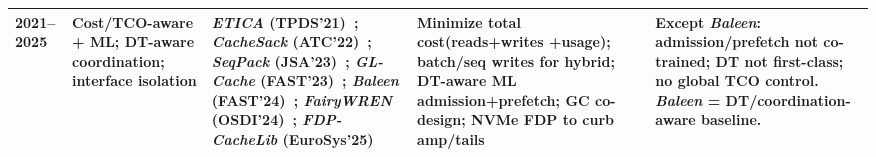 \begin{table}[ht]
\begin{center}
\begin{tabularx}{\columnwidth}{
|>{\centering\arraybackslash}p{0.6cm}
|>{\centering\arraybackslash}p{1.5cm}
|>{\centering\arraybackslash}p{2.35cm}
|>{\centering\arraybackslash}p{2.0cm}
|>{\centering\arraybackslash}p{1.6cm}|}
\textbf{2021--2025} &
Cost/TCO-aware + ML; DT-aware coordination; interface isolation &
\textit{ETICA} (TPDS'21)~\cite{ahmadian2021etica}; 
\textit{CacheSack} (ATC'22)~\cite{yang2022cachesack}; 
\textit{SeqPack} (JSA'23)~\cite{tang2023seqpack}; 
\textit{GL-Cache} (FAST'23)~\cite{yang2023glcache}; 
\textit{Baleen} (FAST'24)~\cite{wong2024baleen}; 
\textit{FairyWREN} (OSDI'24)~\cite{osdi24-fairywren}; 
\textit{FDP-CacheLib} (EuroSys'25)~\cite{allison2025fdp} &
Minimize total cost(reads+writes +usage); batch/seq writes for hybrid; DT-aware ML admission+prefetch; GC co-design; NVMe FDP to curb amp/tails &
Except \emph{Baleen}: admission/prefetch not co-trained; DT not first-class; no global TCO control. \emph{Baleen} = DT/coordination-aware baseline. \\ \hline
\end{tabularx}
\endgroup
\end{center}
\end{table}

